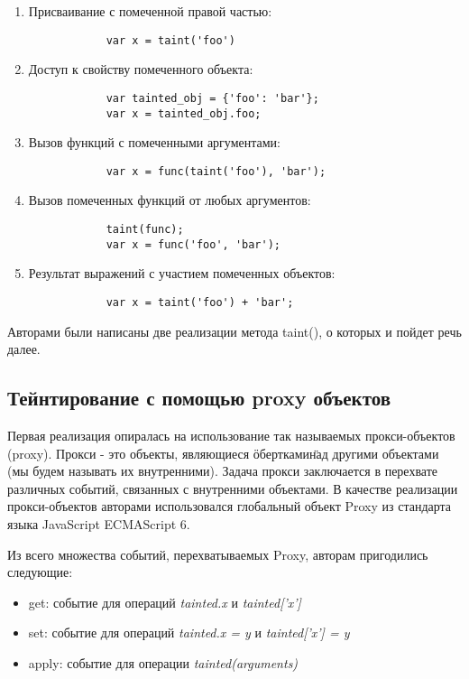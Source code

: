 \bigskip
\begin{enumerate}
	\item Присваивание с помеченной правой частью:
		\begin{lstlisting}
			var x = taint('foo')
		\end{lstlisting}
	\item Доступ к свойству помеченного объекта: 
		\begin{lstlisting}
			var tainted_obj = {'foo': 'bar'}; 
			var x = tainted_obj.foo; 
		\end{lstlisting}
	\item Вызов функций с помеченными аргументами:
		\begin{lstlisting}
			var x = func(taint('foo'), 'bar');
		\end{lstlisting}
	\item Вызов помеченных функций от любых аргументов:
		\begin{lstlisting}
			taint(func);
			var x = func('foo', 'bar');
		\end{lstlisting}
	\item Результат выражений с участием помеченных объектов:
		\begin{lstlisting}
			var x = taint('foo') + 'bar';
		\end{lstlisting}
\end{enumerate}


Авторами были написаны две реализации метода taint(), о которых и пойдет речь далее.

\subsection{Тейнтирование с помощью proxy объектов}
	
	Первая реализация опиралась на использование так называемых прокси-объектов (proxy). Прокси - это объекты, являющиеся \"обертками\" над другими объектами (мы будем называть их внутренними). Задача прокси заключается в перехвате различных событий, связанных с внутренними объектами. В качестве реализации прокси-объектов авторами использовался глобальный объект Proxy из стандарта языка JavaScript ECMAScript 6.

	
	Из всего множества событий, перехватываемых Proxy, авторам пригодились следующие:
	
	\bigskip
	\begin{itemize}
		\item get: событие для операций \textit{tainted.x} и \textit{tainted['x']}
		\item set: событие для операций \textit{tainted.x = y} и \textit{tainted['x'] = y}
		\item apply: событие для операции \textit{tainted(arguments)}
	\end{itemize}


